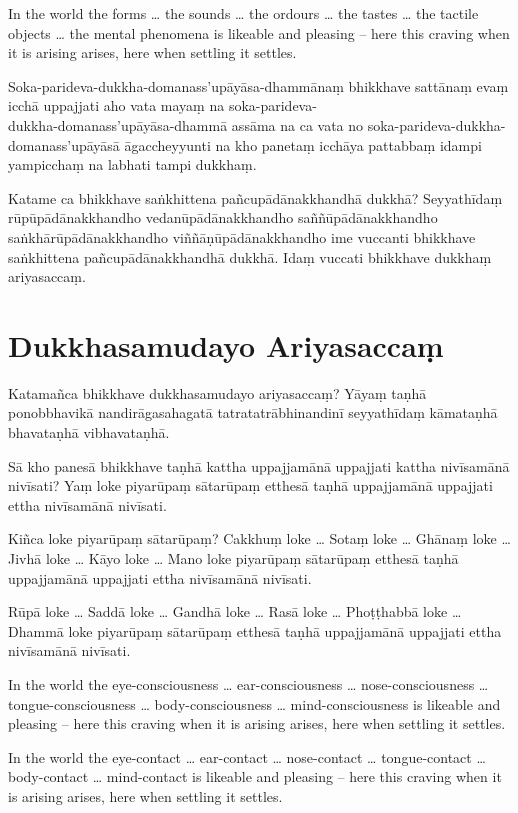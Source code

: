 In the world the forms \ldots{} the sounds \ldots{} the ordours \ldots{} the
tastes \ldots{} the tactile objects \ldots{} the mental phenomena is likeable
and pleasing -- here this craving when it is arising arises, here when settling
it settles.

\paliPage

Soka-parideva-dukkha-domanass'upāyāsa-dhammānaṃ bhikkhave sattānaṃ evaṃ icchā
uppajjati aho vata mayaṃ na soka-parideva-\\
dukkha-domanass'upāyāsa-dhammā assāma na
ca vata no soka-parideva-dukkha-domanass'upāyāsā āgaccheyyunti na kho panetaṃ
icchāya pattabbaṃ idampi yampicchaṃ na labhati tampi dukkhaṃ.

Katame ca bhikkhave saṅkhittena pañcupādānakkhandhā dukkhā? Seyyathīdaṃ
rūpūpādānakkhandho vedanūpādānakkhandho saññūpādānakkhandho
saṅkhārūpādānakkhandho viññāṇūpādānakkhandho ime vuccanti bhikkhave saṅkhittena
pañcupādānakkhandhā dukkhā. Idaṃ vuccati bhikkhave dukkhaṃ ariyasaccaṃ.

\section*{Dukkhasamudayo Ariyasaccaṃ}

Katamañca bhikkhave dukkhasamudayo ariyasaccaṃ? Yāyaṃ taṇhā ponobbhavikā
nandirāgasahagatā tatratatrābhinandinī seyyathīdaṃ kāmataṇhā bhavataṇhā
vibhavataṇhā.

Sā kho panesā bhikkhave taṇhā kattha uppajjamānā uppajjati kattha nivīsamānā
nivīsati? Yaṃ loke piyarūpaṃ sātarūpaṃ etthesā taṇhā uppajjamānā uppajjati ettha
nivīsamānā nivīsati.

Kiñca loke piyarūpaṃ sātarūpaṃ? Cakkhuṃ loke \ldots{} Sotaṃ loke \ldots{} Ghānaṃ
loke \ldots{} Jivhā loke \ldots{} Kāyo loke \ldots{} Mano loke piyarūpaṃ
sātarūpaṃ etthesā taṇhā uppajjamānā uppajjati ettha nivīsamānā nivīsati.

Rūpā loke \ldots{} Saddā loke \ldots{} Gandhā loke \ldots{} Rasā loke \ldots{}
Phoṭṭhabbā loke \ldots{} Dhammā loke piyarūpaṃ sātarūpaṃ etthesā taṇhā
uppajjamānā uppajjati ettha nivīsamānā nivīsati.

\englishPage

In the world the eye-consciousness \ldots{} ear-consciousness \ldots{} nose-consciousness
 \ldots{} tongue-consciousness \ldots{} body-consciousness \ldots{} mind-consciousness is likeable
and pleasing -- here this craving when it is arising arises, here when settling
it settles.

In the world the eye-contact \ldots{} ear-contact \ldots{} nose-contact \ldots{}
tongue-contact \ldots{} body-contact \ldots{} mind-contact is likeable and
pleasing -- here this craving when it is arising arises, here when settling it
settles.

